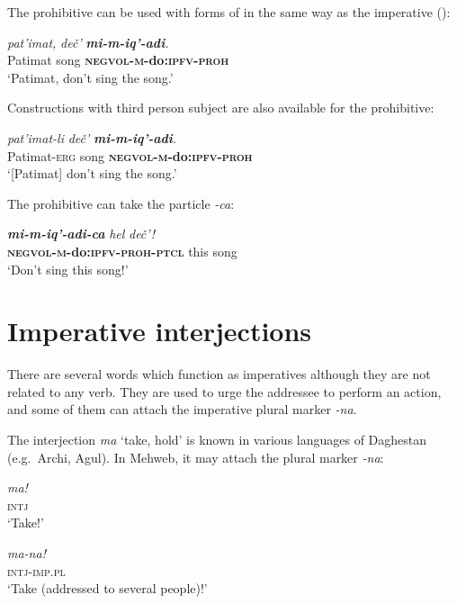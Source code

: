 ﻿\documentclass[output=paper]{langsci/langscibook}
\begin{document}
The prohibitive can be used with forms of  in the same way as the imperative ():

\ea %
\gll \emph{pat'imat,} \emph{deč'} \emph{\textbf{mi-m-iq'-adi}.}\\
 Patimat song \textbf{\textsc{negvol}-\textsc{m}-do:\textsc{ipfv}-\textsc{proh}}\\
\glt `Patimat, don't sing the song.'

\z

Constructions with third person subject are also available for the
prohibitive:

\ea %
\gll \emph{pat'imat-li} \emph{deč'}  \emph{\textbf{mi-m-iq'-adi}.}\\
 Patimat-\textsc{erg} song \textbf{\textsc{negvol}-\textsc{m}-do:\textsc{ipfv}-\textsc{proh}}\\
\glt `[Patimat] don't sing the song.'
\z

The prohibitive can take the particle \emph{-ca}:

\ea %
\gll \emph{\textbf{mi-m-iq'-adi-ca}} \emph{hel}  \emph{deč'!}\\
 \textbf{\textsc{negvol}-\textsc{m}-do:\textsc{ipfv}-\textsc{proh}-\textsc{ptcl}} this song\\
\glt `Don't sing this song!'
\z

\removelastskip
{}

\section{Imperative interjections}\label{imperative-interjections}

There are several words which function as imperatives although they are
not related to any verb. They are used to urge the addressee to perform
an action, and some of them can attach the imperative plural marker
\emph{-na}.

The interjection \emph{ma} `take, hold' is known in various languages of
Daghestan (e.g.\ Archi, Agul). In Mehweb, it may attach the plural
marker \emph{-na}:

\ea %
\gll \emph{ma!}\\
\textsc{intj}\\
\glt `Take!'

\ex %
\gll \emph{ma-na!}\\
\textsc{intj}-\textsc{imp}.\textsc{pl}\\
\glt `Take (addressed to several people)!'
\z
\end{document}
